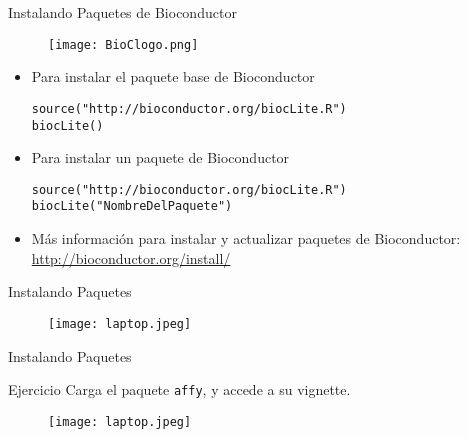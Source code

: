 \documentclass{beamer}
\begin{document}
\begin{frame}[fragile]{Instalando Paquetes de Bioconductor}
\begin{figure}[H]
\centering
\texttt{[image: BioClogo.png]}
\end{figure}
\begin{itemize}
\item Para instalar el paquete base de Bioconductor
\begin{verbatim}
source("http://bioconductor.org/biocLite.R")
biocLite()
\end{verbatim}
\item Para instalar un paquete de Bioconductor
\begin{verbatim}
source("http://bioconductor.org/biocLite.R")
biocLite("NombreDelPaquete")
\end{verbatim}
\item Más información para instalar y actualizar paquetes de Bioconductor: 
\url{http://bioconductor.org/install/}
\end{itemize}
\end{frame}

\begin{frame}[fragile]{Instalando Paquetes}
\begin{figure}[H]
\centering
\texttt{[image: laptop.jpeg]}
\end{figure}
\end{frame}

\begin{frame}[fragile]{Instalando Paquetes}
\begin{block}{Ejercicio}
Carga el paquete \verb=affy=, y accede a su vignette.
\end{block}
\begin{figure}[H]
\centering
\texttt{[image: laptop.jpeg]}
\end{figure}
\end{frame}
\end{document}
